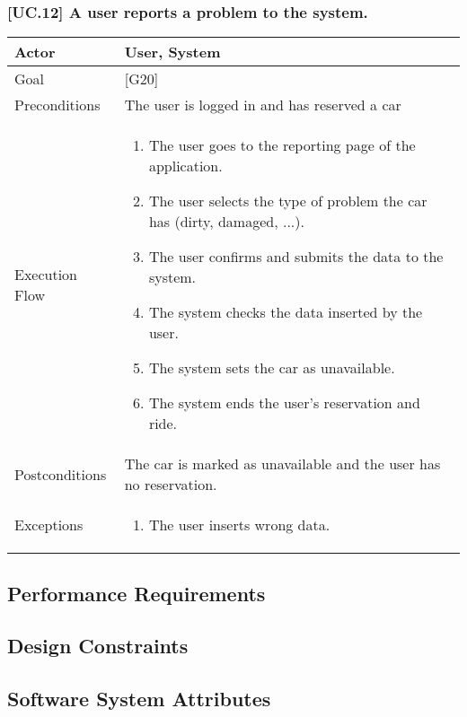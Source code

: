 \documentclass[english]{article}
\begin{document}
  \subsubsection{[UC.12] A user reports a problem to the system.}
  \begin{tabularx}{\textwidth}{  l  X  }
  	\hline
  	Actor & User, System\\
  	\hline
  	Goal & [G20]\\
  	\hline
  	Preconditions & The user is logged in and has reserved a car\\
  	\hline
  	Execution Flow & \begin{enumerate}
  		\item{The user goes to the reporting page of the application.}
  		\item{The user selects the type of problem the car has (dirty, damaged, ...).}
  		\item{The user confirms and submits the data to the system.}
  		\item{The system checks the data inserted by the user.}
  		\item{The system sets the car as unavailable.}
  		\item{The system ends the user's reservation and ride.}
  	\end{enumerate}\\
  	\hline
  	Postconditions & The car is marked as unavailable and the user has no reservation.\\
  	\hline
  	Exceptions & \begin{enumerate}
  		\item{The user inserts wrong data.}
  	\end{enumerate}\\
  	\hline
  \end{tabularx}


\subsection{Performance Requirements}

\subsection{Design Constraints}

\subsection{Software System Attributes}
\end{document}

